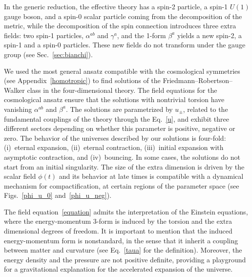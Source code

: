 \documentclass[aps,prd,12pt,superscriptaddress,showpacs,showkeys,longbibliography,reprint,nofootinbib]{revtex4-1}
\begin{document}
In the generic reduction, the effective theory has a spin-2 particle, a spin-1 $U(1)$ gauge boson, and a spin-0 scalar particle coming from the decomposition of the metric, while the decomposition of the spin connection introduces three extra fields: two spin-1 particles, $\alpha^{ab}$ and $\gamma^a$, and the 1-form $\beta^a$ yields a new spin-2, a spin-1 and a spin-0 particles. These new fields do not transform under the gauge group (see Sec.~\ref{sec:bianchi}).

We used the most general ansatz compatible with the cosmological symmetries (see Appendix~\ref{homotropic}) to find solutions of the Friedmann--Robertson--Walker class in the four-dimensional theory. The field equations for the cosmological ansatz ensure that the solutions with nontrivial torsion have vanishing $\alpha^{ab}$ and $\beta^a$. The solutions are parametrized by $u_\pm$, related to the fundamental couplings of the theory through the Eq.~\eqref{u}, and exhibit three different sectors depending on whether this parameter is positive, negative or zero. The behavior of the universes described by our solutions is four-fold: (i)~eternal expansion, (ii)~eternal contraction, (iii)~initial expansion with asymptotic contraction, and (iv)~bouncing. %
In some cases, the solutions do not start from an initial singularity. The size of the extra dimension is driven by the scalar field $\phi(t)$ and its behavior at late times is compatible with a dynamical mechanism for compactification, at certain regions of the parameter space (see Figs.~\ref{phi_u_0} and~\ref{phi_u_neg}). 

The field equation~\eqref{equation} admits the interpretation of the Einstein equations, where the energy-momentum $3$-form is induced by the torsion and the extra dimensional degrees of freedom. It is important to mention that the induced energy-momentum form is nonstandard, in the sense that it inherit a coupling between matter and curvature (see Eq.~\eqref{taua} for the definition). Moreover, the energy density and the pressure are not positive definite, %
providing a playground for a gravitational explanation for the accelerated expansion of the universe.
\end{document}
